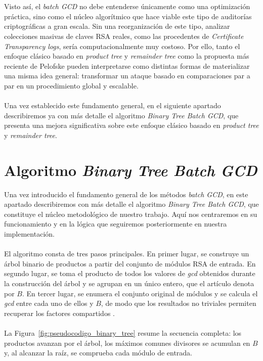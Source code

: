 \\
\\
Visto así, el \textit{batch GCD} no debe entenderse únicamente como una optimización práctica, sino como el núcleo algorítmico que hace viable este tipo de auditorías criptográficas a gran escala. Sin una reorganización de este tipo, analizar colecciones masivas de claves RSA reales, como las procedentes de \textit{Certificate Transparency logs}, sería computacionalmente muy costoso. Por ello, tanto el enfoque clásico basado en \textit{product tree} y \textit{remainder tree} como la propuesta más reciente de Pelofske pueden interpretarse como distintas formas de materializar una misma idea general: transformar un ataque basado en comparaciones par a par en un procedimiento global y escalable.
\\
\\
Una vez establecido este fundamento general, en el siguiente apartado describiremos ya con más detalle el algoritmo \textit{Binary Tree Batch GCD}, que presenta una mejora significativa sobre este enfoque clásico basado en \textit{product tree} y \textit{remainder tree}.

\section{Algoritmo \textit{Binary Tree Batch GCD}}

Una vez introducido el fundamento general de los métodos \textit{batch GCD}, en este apartado describiremos con más detalle el algoritmo \textit{Binary Tree Batch GCD}, que constituye el núcleo metodológico de nuestro trabajo. Aquí nos centraremos en su funcionamiento y en la lógica que seguiremos posteriormente en nuestra implementación.
\\
\\
El algoritmo consta de tres pasos principales. En primer lugar, se construye un árbol binario de productos a partir del conjunto de módulos RSA de entrada. En segundo lugar, se toma el producto de todos los valores de \textit{gcd} obtenidos durante la construcción del árbol y se agrupan en un único entero, que el artículo denota por \(B\). En tercer lugar, se enumera el conjunto original de módulos y se calcula el \textit{gcd} entre cada uno de ellos y \(B\), de modo que los resultados no triviales permiten recuperar los factores compartidos \citep{pelofske2024efficient}.
\\
\\
La Figura~\ref{fig:pseudocodigo_binary_tree} resume la secuencia completa: los productos avanzan por el árbol, los máximos comunes divisores se acumulan en \(B\) y, al alcanzar la raíz, se comprueba cada módulo de entrada.

